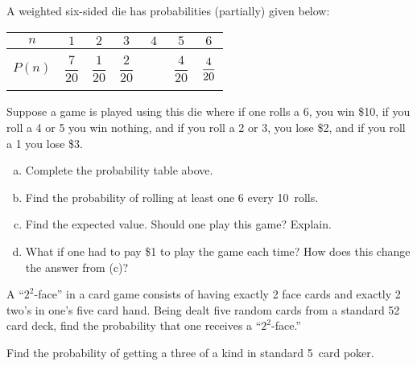 \documentclass[11pt,letterpaper]{article}
\begin{document}
 A weighted six-sided die has probabilities (partially) given below: \par
	\begin{table}[!ht]
	\centering 
	\begin{tabular}{|c||c|c|c|c|c|c|} \hline 
	$n$ & $1$ & $2$ & $3$ & $4$ & $5$ & $6$ \\ \hline 
	$P(n)$ & $\dfrac{7}{20}$ & $\dfrac{1}{20}$ & $\dfrac{2}{20}$ & $\phantom{\dfrac{00}{00}}$ & $\dfrac{4}{20}$ & $\dfrac{4\rule{0pt}{2.9ex}}{20\rule[-1.3ex]{0pt}{0pt}}$ \\ \hline
	\end{tabular}
	\end{table} \par
Suppose a game is played using this die where if one rolls a 6, you win \$10, if you roll a 4 or 5 you win nothing, and if you roll a 2 or 3, you lose \$2, and if you roll a 1 you lose \$3. 
        \begin{enumerate}[(a)]
        \item Complete the probability table above.
        \item Find the probability of rolling at least one 6 every 10~rolls. 
        \item Find the expected value. Should one play this game? Explain.
        \item What if one had to pay \$1 to play the game each time? How does this change the answer from (c)? 
        \end{enumerate}






\newpage





 A ``$2^2$-face'' in a card game consists of having exactly 2 face cards and exactly 2 two's in one's five card hand. Being dealt five random cards from a standard 52 card deck, find the probability that one receives a ``$2^2$-face.'' 





\newpage





 Find the probability of getting a three of a kind in standard 5~card poker. \pspace
\end{document}
